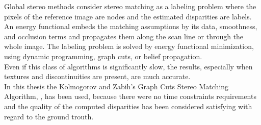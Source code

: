 Global stereo methods consider stereo matching as a labeling problem where the pixels of the reference image are nodes and the estimated disparities are labels. An energy functional embeds the matching assumptions by its data, smoothness, and occlusion terms and propagates them along the scan line or through the whole image. The labeling problem is solved by energy functional minimization, using dynamic programming, graph cuts, or belief propagation.\\
Even if this class of algorithms is significantly slow, the results, especially when textures and discontinuities are present, are much accurate.\\
\newline
In this thesis the Kolmogorov and Zabih's Graph Cuts Stereo Matching Algorithm, \cite{KZ}, has been used, because there were no time constraints requirements and the quality of the computed disparities has been considered satisfying with regard to the ground trouth.\\
